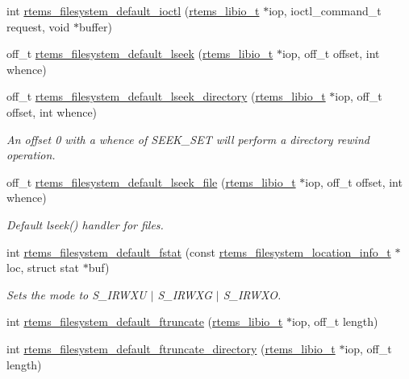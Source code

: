 \begin{DoxyCompactItemize}
int \mbox{\hyperlink{group__LibIOFSHandler_ga50da2d5dcafa7a15fb37916e63e0cd5f}{rtems\+\_\+filesystem\+\_\+default\+\_\+ioctl}} (\mbox{\hyperlink{structrtems__libio__tt}{rtems\+\_\+libio\+\_\+t}} $\ast$iop, ioctl\+\_\+command\+\_\+t request, void $\ast$buffer)
\item 
off\+\_\+t \mbox{\hyperlink{group__LibIOFSHandler_gabc972cf07584efa949cb5ca635de7f06}{rtems\+\_\+filesystem\+\_\+default\+\_\+lseek}} (\mbox{\hyperlink{structrtems__libio__tt}{rtems\+\_\+libio\+\_\+t}} $\ast$iop, off\+\_\+t offset, int whence)
\item 
off\+\_\+t \mbox{\hyperlink{group__LibIOFSHandler_ga2cfb650e15d0a0589079c8c1a5a5c665}{rtems\+\_\+filesystem\+\_\+default\+\_\+lseek\+\_\+directory}} (\mbox{\hyperlink{structrtems__libio__tt}{rtems\+\_\+libio\+\_\+t}} $\ast$iop, off\+\_\+t offset, int whence)
\begin{DoxyCompactList}\small\item\em An offset 0 with a whence of S\+E\+E\+K\+\_\+\+S\+ET will perform a directory rewind operation. \end{DoxyCompactList}\item 
off\+\_\+t \mbox{\hyperlink{group__LibIOFSHandler_ga84f8b0895bbd61dd0f8d5a62864dcc2c}{rtems\+\_\+filesystem\+\_\+default\+\_\+lseek\+\_\+file}} (\mbox{\hyperlink{structrtems__libio__tt}{rtems\+\_\+libio\+\_\+t}} $\ast$iop, off\+\_\+t offset, int whence)
\begin{DoxyCompactList}\small\item\em Default lseek() handler for files. \end{DoxyCompactList}\item 
int \mbox{\hyperlink{group__LibIOFSHandler_ga8df6ed93bdd72abc2cda577c8f78fd54}{rtems\+\_\+filesystem\+\_\+default\+\_\+fstat}} (const \mbox{\hyperlink{group__LibIO_ga3252b3d31ee3c49ffff0b7604a676864}{rtems\+\_\+filesystem\+\_\+location\+\_\+info\+\_\+t}} $\ast$loc, struct stat $\ast$buf)
\begin{DoxyCompactList}\small\item\em Sets the mode to S\+\_\+\+I\+R\+W\+XU $\vert$ S\+\_\+\+I\+R\+W\+XG $\vert$ S\+\_\+\+I\+R\+W\+XO. \end{DoxyCompactList}\item 
int \mbox{\hyperlink{group__LibIOFSHandler_ga10a3664ce71afda3d60d6889a0c84367}{rtems\+\_\+filesystem\+\_\+default\+\_\+ftruncate}} (\mbox{\hyperlink{structrtems__libio__tt}{rtems\+\_\+libio\+\_\+t}} $\ast$iop, off\+\_\+t length)
\item 
int \mbox{\hyperlink{group__LibIOFSHandler_ga17c8ee92bd9c2a374973906270a03b79}{rtems\+\_\+filesystem\+\_\+default\+\_\+ftruncate\+\_\+directory}} (\mbox{\hyperlink{structrtems__libio__tt}{rtems\+\_\+libio\+\_\+t}} $\ast$iop, off\+\_\+t length)

\end{DoxyCompactItemize}
